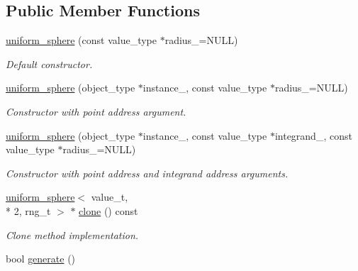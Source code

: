 \subsection*{Public Member Functions}
\begin{DoxyCompactItemize}
\item 
\hypertarget{a00551_a34dcefaa7aae30e4bcaeead1171080e6}{\hyperlink{a00551_a34dcefaa7aae30e4bcaeead1171080e6}{uniform\-\_\-sphere} (const value\-\_\-type $\ast$radius\-\_\-=N\-U\-L\-L)}\label{a00551_a34dcefaa7aae30e4bcaeead1171080e6}

\begin{DoxyCompactList}\small\item\em Default constructor. \end{DoxyCompactList}\item 
\hypertarget{a00551_a99d9ed1840851e9a7eb5ba23665125ca}{\hyperlink{a00551_a99d9ed1840851e9a7eb5ba23665125ca}{uniform\-\_\-sphere} (object\-\_\-type $\ast$instance\-\_\-, const value\-\_\-type $\ast$radius\-\_\-=N\-U\-L\-L)}\label{a00551_a99d9ed1840851e9a7eb5ba23665125ca}

\begin{DoxyCompactList}\small\item\em Constructor with point address argument. \end{DoxyCompactList}\item 
\hypertarget{a00551_aff8dd1a90f5170e5101ace822913adcf}{\hyperlink{a00551_aff8dd1a90f5170e5101ace822913adcf}{uniform\-\_\-sphere} (object\-\_\-type $\ast$instance\-\_\-, const value\-\_\-type $\ast$integrand\-\_\-, const value\-\_\-type $\ast$radius\-\_\-=N\-U\-L\-L)}\label{a00551_aff8dd1a90f5170e5101ace822913adcf}

\begin{DoxyCompactList}\small\item\em Constructor with point address and integrand address arguments. \end{DoxyCompactList}\item 
\hypertarget{a00551_ab1b1701d99a99a692e98f7792487d052}{\hyperlink{a00549}{uniform\-\_\-sphere}$<$ value\-\_\-t, \\*
2, rng\-\_\-t $>$ $\ast$ \hyperlink{a00551_ab1b1701d99a99a692e98f7792487d052}{clone} () const }\label{a00551_ab1b1701d99a99a692e98f7792487d052}

\begin{DoxyCompactList}\small\item\em Clone method implementation. \end{DoxyCompactList}\item 
\hypertarget{a00551_ac011c9492251c5419ec4f88ff4cf8c9a}{bool \hyperlink{a00551_ac011c9492251c5419ec4f88ff4cf8c9a}{generate} ()}\label{a00551_ac011c9492251c5419ec4f88ff4cf8c9a}


\end{DoxyCompactItemize}
